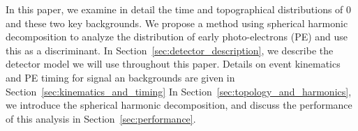 In this paper, we examine in detail the time and topographical distributions of 0\nbb~ and these two key backgrounds. We propose a method 
using spherical harmonic decomposition to analyze the distribution of early photo-electrons (PE) and use this as a discriminant. 
In Section~\ref{sec:detector_description}, we describe the detector model we will use throughout this paper. Details on event kinematics and
PE timing for signal an backgrounds are given in Section~\ref{sec:kinematics_and_timing}
In Section~\ref{sec:topology_and_harmonics}, we introduce the spherical harmonic decomposition, and discuss the performance of this 
analysis in Section~\ref{sec:performance}.



  

